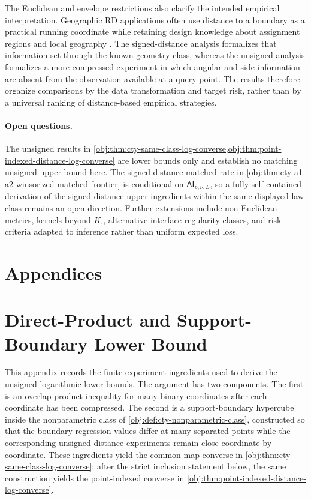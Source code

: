 \documentclass[11pt]{article}
\begin{document}
The Euclidean and envelope restrictions also clarify the intended empirical interpretation. Geographic RD applications often use distance to a boundary as a practical running coordinate while retaining design knowledge about assignment regions and local geography \citep{Papay2011,Reardon2012,Wong2013,Choi2018,Diaz2023,Sawada2024,Merlano2025}. The signed-distance analysis formalizes that information set through the known-geometry class, whereas the unsigned analysis formalizes a more compressed experiment in which angular and side information are absent from the observation available at a query point. The results therefore organize comparisons by the data transformation and target risk, rather than by a universal ranking of distance-based empirical strategies.

\paragraph{Open questions.}
The unsigned results in \cref{obj:thm:cty-same-class-log-converse,obj:thm:point-indexed-distance-log-converse} are lower bounds only and establish no matching unsigned upper bound here. The signed-distance matched rate in \cref{obj:thm:cty-a1-a2-winsorized-matched-frontier} is conditional on \(\mathsf{AI}_{p,\nu,L}\), so a fully self-contained derivation of the signed-distance upper ingredients within the same displayed law class remains an open direction. Further extensions include non-Euclidean metrics, kernels beyond \(K_\square\), alternative interface regularity classes, and risk criteria adapted to inference rather than uniform expected loss.


\appendix

\section*{Appendices}

\section{Direct-Product and Support-Boundary Lower Bound}
\label{sec:app-direct-product}

This appendix records the finite-experiment ingredients used to derive the unsigned logarithmic lower bounds. The argument has two components. The first is an overlap product inequality for many binary coordinates after each coordinate has been compressed. The second is a support-boundary hypercube inside the nonparametric class of \cref{obj:def:cty-nonparametric-class}, constructed so that the boundary regression values differ at many separated points while the corresponding unsigned distance experiments remain close coordinate by coordinate. These ingredients yield the common-map converse in \cref{obj:thm:cty-same-class-log-converse}; after the strict inclusion statement below, the same construction yields the point-indexed converse in \cref{obj:thm:point-indexed-distance-log-converse}.
\end{document}
